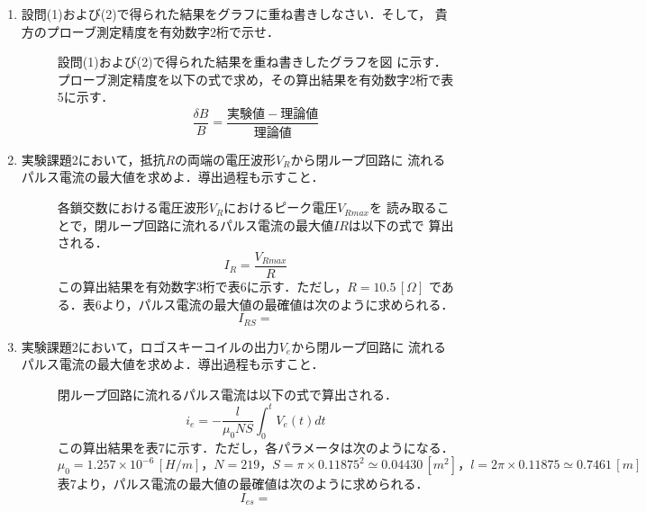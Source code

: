 \begin{enumerate}
    \item 設問(1)および(2)で得られた結果をグラフに重ね書きしなさい．そして，
    貴方のプローブ測定精度を有効数字2桁で示せ．
    \begin{description}
        \item[] 設問(1)および(2)で得られた結果を重ね書きしたグラフを図 に示す．
        プローブ測定精度を以下の式で求め，その算出結果を有効数字2桁で表5に示す．
        $$
        \frac{\delta B}{B}=\frac{実験値-理論値}{理論値}
        $$
    \end{description}

    \item 実験課題2において，抵抗$R$の両端の電圧波形$V_R$から閉ループ回路に
    流れるパルス電流の最大値を求めよ．導出過程も示すこと．
    \begin{description}
        \item[] 各鎖交数における電圧波形$V_R$におけるピーク電圧$V_{Rmax}$を
        読み取ることで，閉ループ回路に流れるパルス電流の最大値$IR$は以下の式で
        算出される．
        $$
        I_R=\frac{V_{Rmax}}{R}
        $$
        この算出結果を有効数字3桁で表6に示す．ただし，$R= 10.5\,[\Omega]$
        である．表6より，パルス電流の最大値の最確値は次のように求められる．
        $$
        I_{RS}=
        $$
    \end{description}
    
    \item 実験課題2において，ロゴスキーコイルの出力$V_e$から閉ループ回路に
    流れるパルス電流の最大値を求めよ．導出過程も示すこと．
    \begin{description}
        \item[] 閉ループ回路に流れるパルス電流は以下の式で算出される．
        $$
        i_e=-\frac{l}{\mu_0 NS}\int_{0}^{t}V_e(t)dt
        $$
        この算出結果を表7に示す．ただし，各パラメータは次のようになる．
        $$
        \mu_0=1.257\times 10^{-6}\,[\si{H/m}]，N=219，S=\pi\times 0.11875^2\simeq 0.04430\,[\si{m^2}]，l=2\pi\times 0.11875\simeq 0.7461\,[\si{m}]
        $$
        表7より，パルス電流の最大値の最確値は次のように求められる．
        $$
        I_{es}=
        $$
    \end{description}
    

\end{enumerate}
